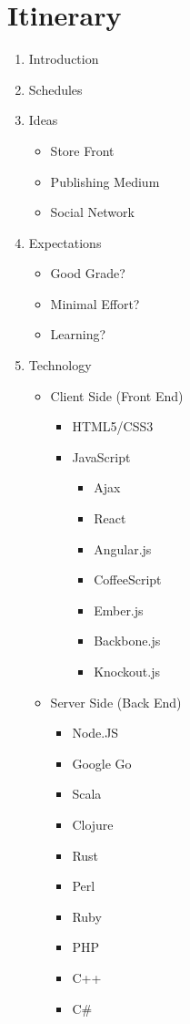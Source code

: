 \documentclass{article}
\begin{document}
\section{Itinerary}
\begin{enumerate}
\item Introduction
\item Schedules
\item Ideas
    \begin{itemize}
    \item Store Front
    \item Publishing Medium
    \item Social Network
    \end{itemize}
\item Expectations
    \begin{itemize}
    \item Good Grade?
    \item Minimal Effort?
    \item Learning?
    \end{itemize}
\item Technology
    \begin{itemize}
    \item Client Side (Front End)
        \begin{itemize}
        \item HTML5/CSS3
        \item JavaScript
            \begin{itemize}
            \item Ajax
            \item React
            \item Angular.js
            \item CoffeeScript
            \item Ember.js
            \item Backbone.js
            \item Knockout.js
            \end{itemize}
        \end{itemize}

    \item Server Side (Back End)
        \begin{itemize}
        \item Node.JS
        \item Google Go
        \item Scala
        \item Clojure
        \item Rust
        \item Perl
        \item Ruby
        \item PHP
        \item C++
        \item C\#
        \end{itemize}


\end{itemize}
\end{enumerate}
\end{document}
